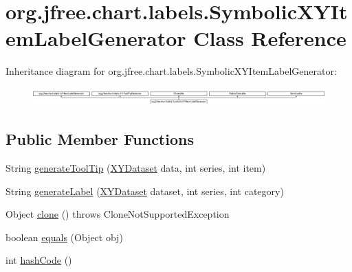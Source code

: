 \hypertarget{classorg_1_1jfree_1_1chart_1_1labels_1_1_symbolic_x_y_item_label_generator}{}\section{org.\+jfree.\+chart.\+labels.\+Symbolic\+X\+Y\+Item\+Label\+Generator Class Reference}
\label{classorg_1_1jfree_1_1chart_1_1labels_1_1_symbolic_x_y_item_label_generator}
Inheritance diagram for org.\+jfree.\+chart.\+labels.\+Symbolic\+X\+Y\+Item\+Label\+Generator\+:\begin{figure}[H]
\begin{center}
\leavevmode
\includegraphics[height=0.695652cm]{classorg_1_1jfree_1_1chart_1_1labels_1_1_symbolic_x_y_item_label_generator}
\end{center}
\end{figure}
\subsection*{Public Member Functions}
\begin{DoxyCompactItemize}
\item 
String \mbox{\hyperlink{classorg_1_1jfree_1_1chart_1_1labels_1_1_symbolic_x_y_item_label_generator_ad133f7091fceb664460b72ac58aaabc6}{generate\+Tool\+Tip}} (\mbox{\hyperlink{interfaceorg_1_1jfree_1_1data_1_1xy_1_1_x_y_dataset}{X\+Y\+Dataset}} data, int series, int item)
\item 
String \mbox{\hyperlink{classorg_1_1jfree_1_1chart_1_1labels_1_1_symbolic_x_y_item_label_generator_a9877321480c5c8de6b5bbbf923801e09}{generate\+Label}} (\mbox{\hyperlink{interfaceorg_1_1jfree_1_1data_1_1xy_1_1_x_y_dataset}{X\+Y\+Dataset}} dataset, int series, int category)
\item 
Object \mbox{\hyperlink{classorg_1_1jfree_1_1chart_1_1labels_1_1_symbolic_x_y_item_label_generator_aa767b3bb0f91e39f3491762f3a6f1600}{clone}} ()  throws Clone\+Not\+Supported\+Exception 
\item 
boolean \mbox{\hyperlink{classorg_1_1jfree_1_1chart_1_1labels_1_1_symbolic_x_y_item_label_generator_ad82c453d64abfffb881d13f97aa377e5}{equals}} (Object obj)
\item 
int \mbox{\hyperlink{classorg_1_1jfree_1_1chart_1_1labels_1_1_symbolic_x_y_item_label_generator_a379926e2c13762e0f2c798d7e43ebc71}{hash\+Code}} ()
\end{DoxyCompactItemize}


